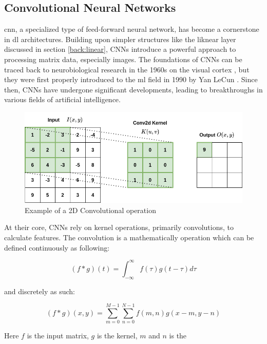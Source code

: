 \subsection{Convolutional Neural Networks}
\label{back:cnn}

\acrfull{cnn}, a specialized type of feed-forward neural network, has become a cornerstone in \acrshort{dl} architectures. Building upon simpler structures like the liknear layer discussed in section \ref{back:linear}, CNNs introduce a powerful approach to processing matrix data, especially images.
The foundations of CNNs can be traced back to neurobiological research in the 1960s on the visual cortex \cite{hubel1962receptive}, but they were first properly introduced to the \acrshort{ml} field in 1990 by Yan LeCun \cite{NIPS1989_53c3bce6}. Since then, CNNs have undergone significant developments, leading to breakthroughs in various fields of artificial intelligence. \\

\begin{figure}[!h]
    \centering
    \includegraphics[width=0.8\linewidth]{figures/convolution.png}
    \caption{Example of a 2D Convolutional operation}
    \label{fig:2dconv}
\end{figure}

At their core, CNNs rely on kernel operations, primarily convolutions, to calculate features. The convolution is a mathematically operation which can be defined continuously as following:

\begin{equation}
(f * g)(t) = \int_{-\infty}^{\infty} f(\tau) g(t - \tau) d\tau
\label{eq:contconv}
\end{equation}

and discretely as such:

\begin{equation}
   (f * g)(x, y) = \sum_{m=0}^{M-1} \sum_{n=0}^{N-1} f(m, n)g(x-m, y-n) 
\label{eq:conv}
\end{equation}

Here $f$ is the input matrix, $g$ is the kernel, $m$ and $n$ is the 


